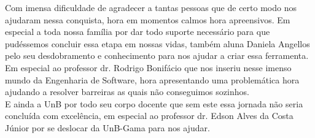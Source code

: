 Com imensa dificuldade de agradecer a tantas pessoas que de certo modo nos ajudaram nessa conquista, hora em momentos calmos hora apreensivos. Em especial a toda nossa família por dar todo suporte necessário para que pudéssemos concluir essa etapa em nossas vidas, também aluna Daniela Angellos pelo seu desdobramento e conhecimento para nos ajudar a criar essa ferramenta.\\
Em especial ao professor dr. Rodrigo Bonifácio que nos inseriu nesse imenso mundo da Engenharia de Software, hora apresentando uma problemática hora ajudando a resolver barreiras as quais não conseguimos sozinhos.\\
E ainda a UnB por todo seu corpo docente que sem este essa jornada não seria concluída com excelência, em especial ao professor dr. Edson Alves da Costa Júnior por se deslocar da UnB-Gama para nos ajudar.\\
